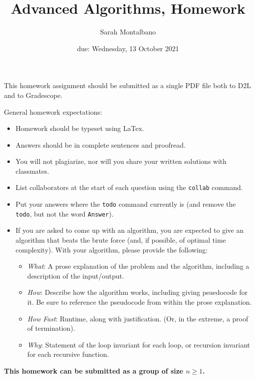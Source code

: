 \documentclass{article}
\title{Advanced Algorithms, Homework \hwnum}
\author{Sarah Montalbano}
\date{due: Wednesday, 13 October 2021}
\begin{document}
\maketitle

This homework assignment should be
submitted as a single PDF file both to D2L and to Gradescope.

General homework expectations:
\begin{itemize}
    \item Homework should be typeset using LaTex.
    \item Answers should be in complete sentences and proofread.
    \item You will not plagiarize, nor will you share your written solutions
        with classmates.
    \item List collaborators at the start of each question using the
        \texttt{collab} command.
    \item Put your answers where the \texttt{todo} command currently is (and
        remove the \texttt{todo}, but not the word \texttt{Answer}).
    \item If you are asked to come up with an algorithm, you are
        expected to give an algorithm that beats the brute force (and, if possible, of
        optimal time complexity). With your algorithm, please provide the following:
        \begin{itemize}
            \item \emph{What}: A prose explanation of the problem and the algorithm,
                including a description of the input/output.
            \item \emph{How}: Describe how the algorithm works, including giving
                psuedocode for it.  Be sure to reference the pseudocode
                from within the prose explanation.
            \item \emph{How Fast}: Runtime, along with justification.  (Or, in the
                extreme, a proof of termination).
            \item \emph{Why}: Statement of the loop invariant for each loop, or
                recursion invariant for each recursive function.
        \end{itemize}
\end{itemize}

{\bf
This homework can be submitted as a group of size $n \geq 1$.
}

\collab{}
\end{document}
